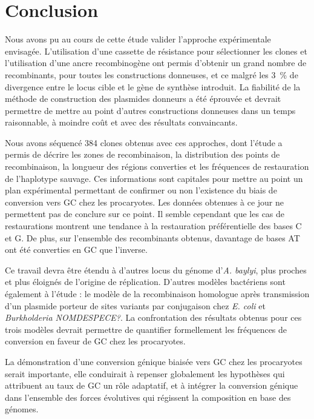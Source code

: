 \section*{Conclusion}
\label{sec:conclusion}

Nous avons pu au cours de cette étude valider l'approche expérimentale
envisagée. L'utilisation d'une cassette de résistance pour sélectionner les
clones et l'utilisation d'une ancre recombinogène ont permis d'obtenir un grand
nombre de recombinants, pour toutes les constructions donneuses, et ce malgré
les \SI{3}{\percent} de divergence entre le locus cible et le gène de synthèse
introduit. La fiabilité de la méthode de construction des plasmides donneurs a
été éprouvée et devrait permettre de mettre au point d'autres constructions
donneuses dans un temps raisonnable, à moindre coût et avec des résultats
convaincants.

Nous avons séquencé 384 clones obtenus avec ces approches, dont l'étude a permis
de décrire les zones de recombinaison, la distribution des points de
recombinaison, la longueur des régions converties et les fréquences de
restauration de l'haplotype sauvage. Ces informations sont capitales pour mettre
au point un plan expérimental permettant de confirmer ou non l'existence du
biais de conversion vers GC chez les procaryotes. Les données obtenues à ce jour
ne permettent pas de conclure sur ce point. Il semble cependant que les cas de
restaurations montrent une tendance à la restauration préférentielle des bases C
et G. De plus, sur l'ensemble des recombinants obtenus, davantage de bases AT
ont été converties en GC que l'inverse.

Ce travail devra être étendu à d'autres locus du génome d'\emph{A. baylyi}, plus
proches et plus éloignés de l'origine de réplication. D'autres modèles
bactériens sont également à l'étude : le modèle de la recombinaison homologue
après transmission d'un plasmide porteur de sites variants par conjugaison chez
\emph{E. coli} et \emph{Burkholderia NOMDESPECE?}. La confrontation des
résultats obtenus pour ces trois modèles devrait permettre de quantifier
formellement les fréquences de conversion en faveur de GC chez les procaryotes.

La démonstration d'une conversion génique biaisée vers GC chez les procaryotes
serait importante, elle conduirait à repenser globalement les hypothèses qui
attribuent au taux de GC un rôle adaptatif, et à intégrer la conversion génique
dans l'ensemble des forces évolutives qui régissent la composition en base des
génomes.
